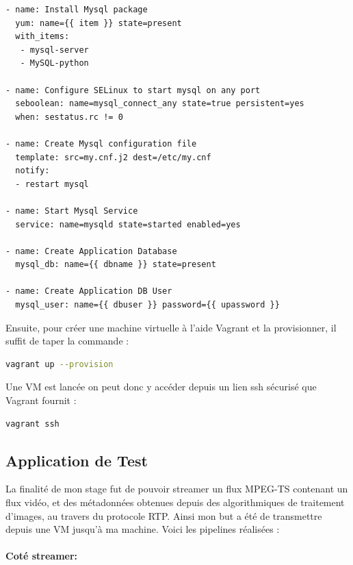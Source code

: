   \begin{lstlisting}[caption=exemple de rôles Ansible ,label=ansible_exemple]
    - name: Install Mysql package
  yum: name={{ item }} state=present
  with_items:
   - mysql-server
   - MySQL-python

- name: Configure SELinux to start mysql on any port
  seboolean: name=mysql_connect_any state=true persistent=yes
  when: sestatus.rc != 0

- name: Create Mysql configuration file
  template: src=my.cnf.j2 dest=/etc/my.cnf
  notify:
  - restart mysql

- name: Start Mysql Service
  service: name=mysqld state=started enabled=yes

- name: Create Application Database
  mysql_db: name={{ dbname }} state=present

- name: Create Application DB User
  mysql_user: name={{ dbuser }} password={{ upassword }}
  \end{lstlisting}


 Ensuite, pour créer une machine virtuelle à l'aide Vagrant et la provisionner, il suffit de taper la commande :
  \begin{lstlisting}[language=bash]
  vagrant up --provision
  \end{lstlisting}
 Une VM est lancée on peut donc y accéder depuis un lien ssh sécurisé que Vagrant fournit :
  \begin{lstlisting}[language=bash]
  vagrant ssh
  \end{lstlisting}


 \subsection{Application de Test}
La finalité de mon stage fut de pouvoir streamer un flux MPEG-TS contenant un flux vidéo, et des métadonnées obtenues depuis des algorithmiques de traitement d'images, au travers du protocole RTP. Ainsi mon but a été de transmettre depuis une VM jusqu'à ma machine.
Voici les pipelines réalisées :

\paragraph{Coté streamer: }

